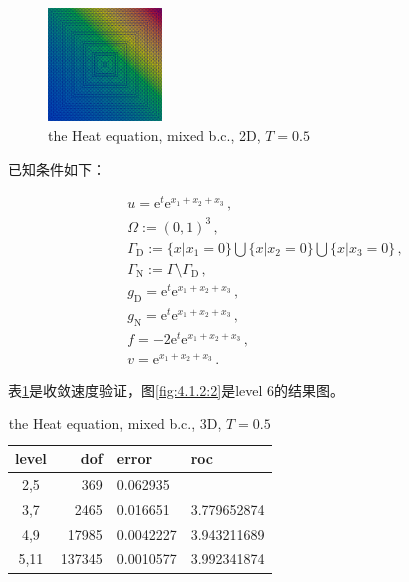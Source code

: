 \begin{figure}[!htbp]
  \centering
  \includegraphics[height=3cm]{fig/4/fig:1.1.2:1.png}
  \caption{the Heat equation, mixed b.c., 2D, $T=0.5$}
  \label{fig:4.1.2:1}
\end{figure}


已知条件如下：

\begin{subequations}	   
  \begin{align*}	      
   &u=\mathrm e^t\mathrm e^{x_1+x_2+x_3}\,,\\
   &\Omega:=(0,1)^3\,,\\
   &\Gamma_{\mathrm D}:=\{x|x_1=0\}\bigcup\{x|x_2=0\}\bigcup\{x|x_3=0\}\,,\\
   &\Gamma_{\mathrm N}:=\Gamma\setminus\Gamma_{\mathrm D}\,, \\
   &g_{\mathrm D}=\mathrm e^t\mathrm e^{x_1+x_2+x_3}\,,\\
   &g_{\mathrm N}=\mathrm e^t\mathrm e^{x_1+x_2+x_3}\,,\\
   &f=-2\mathrm e^t\mathrm e^{x_1+x_2+x_3}\,,\\
    &v=\mathrm e^{x_1+x_2+x_3}\,.
  \end{align*}
\end{subequations}	   

表\ref{tab:4.1.2:2}是收敛速度验证，图\ref{fig:4.1.2:2}是level 6的结果图。

\begin{table}[!htbp]\label{tab:4.1.2:2}
  \centering
  \begin{tabular}{c|r|l|l}
    level   &       dof  &          error    &       roc \\
    \hline
    2,5     &    369     &       0.062935 &\\
    \hline
    3,7     &    2465    &       0.016651  &      3.779652874 \\
    \hline
    4,9     &    17985   &       0.0042227  &     3.943211689 \\
    \hline
    5,11    &    137345  &       0.0010577   &    3.992341874
  \end{tabular}
  \caption{the Heat equation, mixed b.c., 3D, $T=0.5$}
\end{table}

